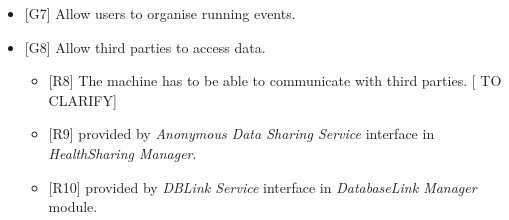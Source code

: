 \documentclass[DD.tex]{subfiles}
\begin{document}
\begin{itemize}
	\item {[G7]} Allow users to organise running events.
	
	\item {[G8]} Allow third parties to access data.
	\begin{itemize}
		\item {[R8]} The machine has to be able to communicate with 
		third parties. [	TO CLARIFY]
		\item {[R9]} provided by \textit{Anonymous Data Sharing Service} interface in \textit{HealthSharing Manager}.
		\item {[R10]} provided by \textit{DBLink Service} interface in \textit{DatabaseLink Manager} module.
	\end{itemize}
	
\end{itemize}
\newpage
\end{document}
